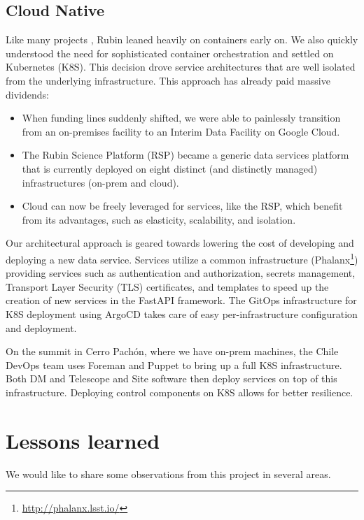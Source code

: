 \documentclass[11pt,twoside]{article}
\begin{document}
\subsection{Cloud Native}
\label{sec:cloudnative}
Like many projects \citep{2017ASPC..512...33O}, Rubin leaned heavily on containers early on.
We also quickly understood the need for sophisticated container orchestration and settled on Kubernetes (K8S).
This decision drove service architectures that are well isolated from the underlying infrastructure.
This approach has already paid massive dividends:

\begin{itemize}
\item When funding lines suddenly shifted, we were able to painlessly transition from an on-premises facility to an Interim Data Facility on Google Cloud.
\item The Rubin Science Platform (RSP) became a generic data services platform that is currently deployed on eight distinct (and distinctly managed) infrastructures (on-prem and cloud).
\item Cloud can now be freely leveraged for services, like the RSP, which benefit from its advantages, such as elasticity, scalability, and isolation.
\end{itemize}

Our architectural approach is geared towards lowering the cost of developing and deploying a new data service.
Services utilize a common infrastructure (Phalanx\footnote{\url{http://phalanx.lsst.io/}}) providing services such as authentication and authorization, secrets management, Transport Layer Security (TLS) certificates, and templates to speed up the creation of new services in the FastAPI framework.
The GitOps infrastructure for K8S deployment using ArgoCD takes care of easy per-infrastructure configuration and deployment.

On the summit in Cerro Pach\'{o}n, where we have on-prem machines, the Chile DevOps team uses Foreman and Puppet to bring up a full K8S infrastructure.
Both DM and Telescope and Site software then deploy services on top of this infrastructure.
Deploying control components on K8S allows for better resilience.


\section{Lessons learned}
We would like to share some observations from this project in several areas.
\end{document}
